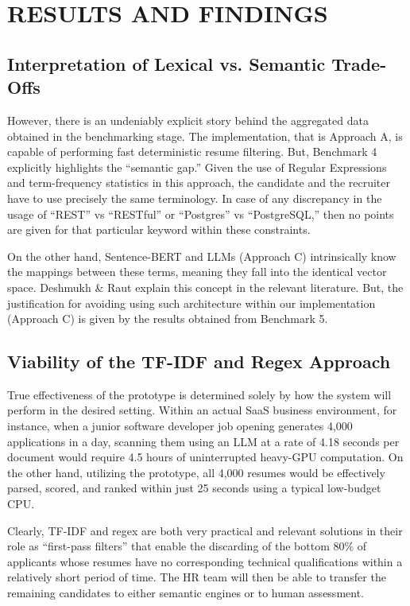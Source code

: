 \chapter{RESULTS AND FINDINGS}

\section{Interpretation of Lexical vs. Semantic Trade-Offs}
However, there is an undeniably explicit story behind the aggregated data obtained in the benchmarking stage. The implementation, that is Approach A, is capable of performing fast deterministic resume filtering. But, Benchmark 4 explicitly highlights the ``semantic gap.'' Given the use of Regular Expressions and term-frequency statistics in this approach, the candidate and the recruiter have to use precisely the same terminology. In case of any discrepancy in the usage of ``REST'' vs ``RESTful'' or ``Postgres'' vs ``PostgreSQL,'' then no points are given for that particular keyword within these constraints.

On the other hand, Sentence-BERT and LLMs (Approach C) intrinsically know the mappings between these terms, meaning they fall into the identical vector space. Deshmukh \& Raut explain this concept in the relevant literature. But, the justification for avoiding using such architecture within our implementation (Approach C) is given by the results obtained from Benchmark 5.

\section{Viability of the TF-IDF and Regex Approach}
True effectiveness of the prototype is determined solely by how the system will perform in the desired setting. Within an actual SaaS business environment, for instance, when a junior software developer job opening generates 4,000 applications in a day, scanning them using an LLM at a rate of 4.18 seconds per document would require 4.5 hours of uninterrupted heavy-GPU computation. On the other hand, utilizing the prototype, all 4,000 resumes would be effectively parsed, scored, and ranked within just 25 seconds using a typical low-budget CPU.

Clearly, TF-IDF and regex are both very practical and relevant solutions in their role as ``first-pass filters'' that enable the discarding of the bottom 80\% of applicants whose resumes have no corresponding technical qualifications within a relatively short period of time. The HR team will then be able to transfer the remaining candidates to either semantic engines or to human assessment.

